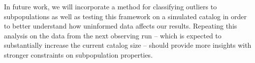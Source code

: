 In future work, we will incorporate a method for classifying outliers to subpopulations as well as testing this framework on a simulated catalog in order to better understand how uninformed data affects our results. Repeating this analysis on the data from the next observing run -- which is expected to substantially increase the current catalog size -- should provide more insights with stronger constraints on subpopulation properties.
